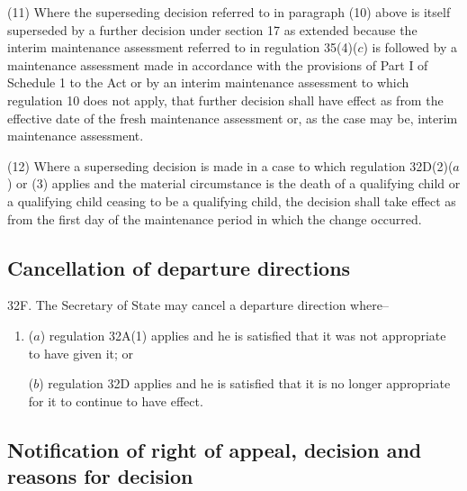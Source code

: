 \documentclass[12pt,a4paper]{article}
\begin{document}
(11) Where the superseding decision referred to in paragraph (10) above is itself superseded by a further decision under section 17 as extended because the interim maintenance assessment referred to in regulation 35(4)($c$) is followed by a maintenance assessment made in accordance with the provisions of Part I of Schedule 1 to the Act or by an interim maintenance assessment to which regulation 10 does not apply, that further decision shall have effect as from the effective date of the fresh maintenance assessment or, as the case may be, interim maintenance assessment.

(12) Where a superseding decision is made in a case to which regulation 32D(2)($a$)  or (3) applies and the material circumstance is the death of a qualifying child or a qualifying child ceasing to be a qualifying child, the decision shall take effect as from the first day of the maintenance period in which the change occurred.


\subsection[32F. Cancellation of departure directions]{Cancellation of departure directions}

32F.  The Secretary of State may cancel a departure direction where–
\begin{enumerate}\item[]
($a$) regulation 32A(1) applies and he is satisfied that it was not appropriate to have given it; or

($b$) regulation 32D applies and he is satisfied that it is no longer appropriate for it to continue to have effect.
\end{enumerate}


\subsection[32G. Notification of right of appeal, decision and reasons for decision]{Notification of right of appeal, decision and reasons for decision}
\end{document}
